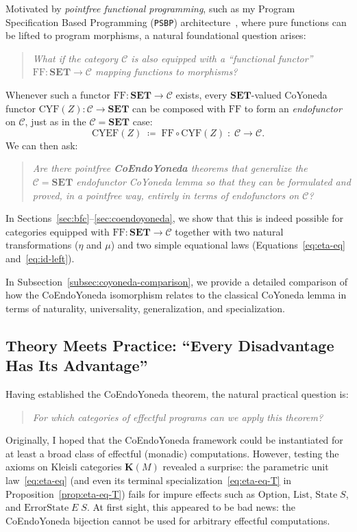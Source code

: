 \documentclass[11pt,a4paper]{article}
\theoremstyle{definition}
\theoremstyle{remark}
\newcommand{\Set}{\mathbf{SET}}
\newcommand{\CYF}{\mathrm{CYF}}
\newcommand{\CYEF}{\mathrm{CYEF}}
\newcommand{\FF}{\mathrm{FF}}
\newcommand{\K}{\mathbf{K}}
\begin{document}
Motivated by \emph{pointfree functional programming}, such as my Program Specification Based
Programming (\texttt{PSBP}) architecture~\cite{PSBP}, where pure functions can be lifted to program
morphisms, a natural foundational question arises:
\begin{quote}
\emph{What if the category $\mathcal{C}$ is also equipped with a ``functional functor''
$\FF : \Set \to \mathcal{C}$ mapping functions to morphisms?}
\end{quote}
Whenever such a functor $\FF : \Set \to \mathcal{C}$ exists, every $\Set$-valued CoYoneda functor
$\CYF(Z) : \mathcal{C} \to \Set$ can be composed with $\FF$ to form an \emph{endofunctor} on
$\mathcal{C}$, just as in the $\mathcal{C} = \Set$ case:
\[
  \CYEF(Z) \;\coloneqq\; \FF \circ \CYF(Z) \;:\; \mathcal{C} \longrightarrow \mathcal{C}.
\]
We can then ask: 
\begin{quote}
\emph{Are there pointfree \textbf{CoEndoYoneda} theorems that generalize the
$\mathcal{C} = \Set$ endofunctor CoYoneda lemma so that they can be formulated and proved, in a
pointfree way, entirely in terms of endofunctors on $\mathcal{C}$?}
\end{quote}

In Sections~\ref{sec:bfc}--\ref{sec:coendoyoneda}, we show that this is indeed possible for categories
equipped with $\FF : \Set \to \mathcal{C}$ together with two natural transformations ($\eta$ and $\mu$)
and two simple equational laws (Equations~\eqref{eq:eta-eq} and~\eqref{eq:id-left}). 

In Subsection~\ref{subsec:coyoneda-comparison}, we provide a detailed comparison of how the
CoEndoYoneda isomorphism relates to the classical CoYoneda lemma in terms of naturality,
universality, generalization, and specialization.

\subsection{Theory Meets Practice: ``Every Disadvantage Has Its Advantage''}

Having established the CoEndoYoneda theorem, the natural practical question is: 
\begin{quote}
\emph{For which
categories of effectful programs can we apply this theorem?}
\end{quote}

Originally, I hoped that the CoEndoYoneda framework could be instantiated for at least a
broad class of effectful (monadic) computations. However, testing the axioms on Kleisli categories
$\K(M)$ revealed a surprise: the parametric unit law~\eqref{eq:eta-eq} (and even its terminal
specialization~\eqref{eq:eta-eq-T} in Proposition~\ref{prop:eta-eq-T}) fails for impure effects such
as $\mathrm{Option}$, $\mathrm{List}$, $\mathrm{State}\;S$, and $\mathrm{ErrorState}\;E\;S$. At first
sight, this appeared to be bad news: the CoEndoYoneda bijection cannot be used for arbitrary effectful
computations.
\end{document}
